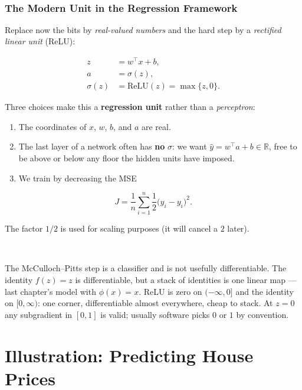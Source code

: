 \documentclass[
]{book}
\begin{document}
~

\subsubsection*{The Modern Unit in the Regression Framework}\label{the-modern-unit-in-the-regression-framework}

Replace now the bits by \emph{real-valued numbers} and the hard step by a \emph{rectified linear unit} (ReLU):

\begin{align*}
z &= w^\top x + b,\\
a &= \sigma(z),\\
\sigma(z)&=\mathrm{ReLU}(z)=\max\{z,0\}.
\end{align*}

Three choices make this a \textbf{regression unit} rather than a \emph{perceptron}:

\begin{enumerate}
\def\labelenumi{\arabic{enumi}.}
\item
  The coordinates of \(x\), \(w\), \(b\), and \(a\) are real.
\item
  The last layer of a network often has \textbf{no} \(\sigma\): we want \(\hat y=w^\top a+b\in\mathbb{R}\), free to be above or below any floor the hidden units have imposed.
\item
  We train by decreasing the MSE
\end{enumerate}

\[
J=\frac1n\sum_{i=1}^n\frac12\bigl(\hat y_{i}-y_{i}\bigr)^2.
\]

The factor \(1/2\) is used for scaling purposes (it will cancel a \(2\) later).

~

The McCulloch--Pitts step is a classifier and is not usefully differentiable. The identity \(f(z)=z\) is differentiable, but a stack of identities is one linear map --- last chapter's model with \(\phi(x)=x\). ReLU is zero on \((-\infty,0]\) and the identity on \([0,\infty)\): one corner, differentiable almost everywhere, cheap to stack. At \(z=0\) any subgradient in \([0,1]\) is valid; usually software picks \(0\) or \(1\) by convention.

\section{Illustration: Predicting House Prices}\label{illustration-predicting-house-prices}
\end{document}
